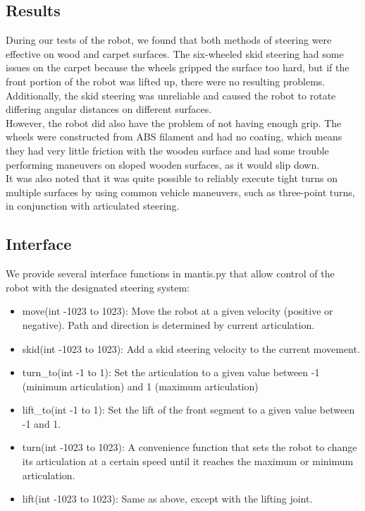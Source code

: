 \documentclass[]{article}
\begin{document}
\subsection{Results}
During our tests of the robot, we found that both methods of steering were effective on wood and carpet surfaces. The six-wheeled skid steering had some issues on the carpet because the wheels gripped the surface too hard, but if the front portion of the robot was lifted up, there were no resulting problems. Additionally, the skid steering was unreliable and caused the robot to rotate differing angular distances on different surfaces.
\\
However, the robot did also have the problem of not having enough grip. The wheels were constructed from ABS filament and had no coating, which means they had very little friction with the wooden surface and had some trouble performing maneuvers on sloped wooden surfaces, as it would slip down.
\\
It was also noted that it was quite possible to reliably execute tight turns on multiple surfaces by using common vehicle maneuvers, such as three-point turns, in conjunction with articulated steering.

\subsection{Interface}
We provide several interface functions in mantis.py that allow control of the robot with the designated steering system:
\begin{itemize}
    \item move(int -1023 to 1023): Move the robot at a given velocity (positive or negative). Path and direction is determined by current articulation.
    \item skid(int -1023 to 1023): Add a skid steering velocity to the current movement.
    \item turn\_to(int -1 to 1): Set the articulation to a given value between -1 (minimum articulation) and 1 (maximum articulation)
    \item lift\_to(int -1 to 1): Set the lift of the front segment to a given value between -1 and 1.
    \item turn(int -1023 to 1023): A convenience function that sets the robot to change its articulation at a certain speed until it reaches the maximum or minimum articulation.
    \item lift(int -1023 to 1023): Same as above, except with the lifting joint.
\end{itemize}
\end{document}
